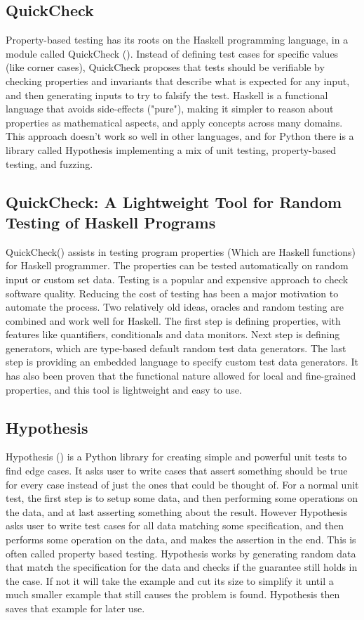 \documentclass[preprint,nocopyrightspace]{sig-alternate}
\begin{document}
\subsection{QuickCheck}
Property-based testing has its roots on the Haskell programming language,
in a module called QuickCheck (\citet{claessen_quickcheck:_2011}).
Instead of defining test cases for specific values (like corner cases),
QuickCheck proposes that tests should be verifiable by checking properties and invariants that describe what is expected for any input,
and then generating inputs to try to falsify the test.
Haskell is a functional language that avoids side-effects ("pure"),
making it simpler to reason about properties as mathematical aspects,
and apply concepts across many domains.
This approach doesn't work so well in other languages,
and for Python there is a library called Hypothesis implementing a mix of unit testing,
property-based testing,
and fuzzing.

\subsection{QuickCheck: A Lightweight Tool for Random Testing of Haskell Programs}
QuickCheck(\citet{claessen_quickcheck:_2011}) assists in testing program properties (Which are Haskell functions) for Haskell programmer.
The properties can be tested automatically on random input or custom set data.
Testing is a popular and expensive approach to check software quality.
Reducing the cost of testing has been a major motivation to automate the process.
Two relatively old ideas, oracles and random testing are combined and work well for Haskell.
The first step is defining properties, with features like quantifiers, conditionals and data monitors.
Next step is defining generators, which are type-based default random test data generators.
The last step is providing an embedded language to specify custom test data generators.
It has also been proven that the functional nature allowed for local and fine-grained properties,
and this tool is lightweight and easy to use.

\subsection{Hypothesis}
Hypothesis (\citet{maciver_welcome_2015}) is a Python library for creating simple and powerful unit tests to find edge cases.
It asks user to write cases that assert something should be true for every case instead of just the ones that could be thought of.
For a normal unit test,
the first step is to setup some data,
and then performing some operations on the data,
and at last asserting something about the result.
However Hypothesis asks user to write test cases for all data matching some specification,
and then performs some operation on the data,
and makes the assertion in the end.
This is often called property based testing.
Hypothesis works by generating random data that match the specification for the data and checks if the guarantee still holds in the case.
If not it will take the example and cut its size to simplify it until a much smaller example that still causes the problem is found.
Hypothesis then saves that example for later use.
\end{document}
